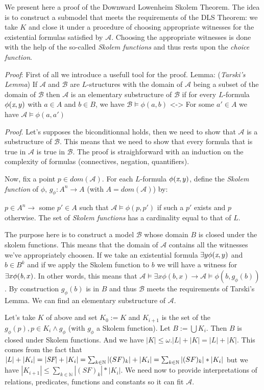 \documentclass[12pt]{article}
\begin{document}
We present here a proof of the Downward Lowenheim Skolem Theorem. The idea is to construct a submodel that meets the requirements of the DLS Theorem: we take $K$ and close it under a procedure of choosing appropriate witnesses for the existential formulas satisfied by $\mathcal{A}$. Choosing the appropriate witnesses is done with the help of the so-called  \emph{Skolem functions} and thus rests upon the \emph{choice function}.

\emph{Proof}: First of all we introduce a usefull tool for the proof.
Lemma: (\emph{Tarski's Lemma}) If  $\mathcal{A}$ and  $\mathcal{B}$ are $L$-structures with the domain of $\mathcal{A}$ being a subset of the domain of $\mathcal{B}$  then $\mathcal{A}$ is an elementary substructure of $\mathcal{B}$ if for every $L$-formula $\phi(\emph{x},y)$ with $a \in A$ and $b \in B$, we have
$\mathcal{B}\models \phi(a,b)$ <-> For some $a' \in A$ we have $\mathcal{A}\models \phi(a,a')$ 

\emph{Proof}. Let's supposes the biconditionnal holds, then we need to show that $\mathcal{A}$ is a substructure of $\mathcal{B}$. This means that we need to show that every formula that is true in $\mathcal{A}$ is true in $\mathcal{B}$. The proof is straighforward with an induction on the complexity of formulas (connectives, negation, quantifiers).  
                       

Now, fix a point $p \in {dom}(\mathcal{A})$. For each $L$-formula $\phi(\emph{x},y)$, define the \emph{Skolem function} of $\phi$, $g_\phi : A^n \to A$ (with $A={dom}(\mathcal{A})$) by:

       $p \in A^n \to$ some $p' \in A$ such that $\mathcal{A}\models \phi(p,p')$ if such a $p'$ exists and $p$ otherwise.
The set of \emph{Skolem functions} has a cardinality equal to that of $L$.

The purpose here is to construct a model $\mathcal{B}$ whose domain $B$ is closed under the skolem functions. This means that the domain of $\mathcal{A}$ contains all the witnesses we've appropriately choosen. If we take an existential formula $\exists y \phi(\emph{x},y)$ and $b \in B^k$ and if we apply the Skolem function to $b$ we will have a witness for $\exists x \phi(\emph{b},x)$. In other words, this means that $\mathcal{A}\models \exists x \phi(b,x) \to \mathcal{A}\models \phi(b,g_\phi(b))$. By construction $g_\phi(b)$ is in $B$ and thus $\mathcal{B}$ meets the requirements of Tarski's Lemma. We can find an elementary substructure of  $\mathcal{A}$.

Let's take $K$ of above and set $K_0:=K$ and $K_{i+1}$ is the set of the $g_\phi(p), p \in K_i \wedge  g_\phi$ (with $g_\phi$ a Skolem function). Let $B:= \bigcup K_i$. Then $B$ is closed under Skolem functions. And we have $|K|\leq \omega .|L|+|K|= |L|+|K|$. This comes from the fact that $|L|+|K_i|=|\emph{SF}|+|K_i|= \sum_{k \in \mathbb{N} }|(SF)_k|+|K_i|= \sum_{k \in \mathbb{N} }|(SF)_k|*|K_i|$ but we have $|K_{i+1}| \leq \sum_{k \in \mathbb{N} }|(SF)_k|*|K_i|$.
We need now to provide interpretations of relations, predicates, functions and constants so it can fit $\mathcal{A}$.
\end{document}

